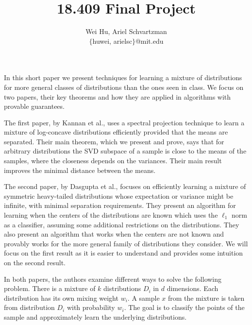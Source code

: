 \documentclass[11pt,letter]{article}
\begin{document}


\title{18.409 Final Project}

\author{Wei Hu, Ariel Schvartzman \\ $\{$huwei, arielsc$\}$@mit.edu} 
 
\maketitle 

In this short paper we present techniques for learning a mixture of distributions for more general classes of distributions than the ones seen in class. We focus on two papers, their key theorems and how they are applied in algorithms with provable guarantees. 

The first paper, by Kannan et al.\cite{doi:10.1137/S0097539704445925}, uses a spectral projection technique to learn a mixture of log-concave distributions efficiently provided that the means are separated. Their main theorem, which we present and prove, says that for arbitrary distributions the SVD subspace of a sample is close to the means of the samples, where the closeness depends on the variances. Their main result improves the minimal distance between the means. 

The second paper, by Dasgupta et al.\cite{1530741}, focuses on efficiently learning a mixture of symmetric heavy-tailed distributions whose expectation or variance might be infinite, with minimal separation requirements. They present an algorithm for learning when the centers of the distributions are known which uses the $\ell_1$ norm as a classifier, assuming some additional restrictions on the distributions. They also present an algorithm that works when the centers are not known and provably works for the more general family of distributions they consider. We will focus on the first result as it is easier to understand and provides some intuition on the second result. 

In both papers, the authors examine different ways to solve the following problem. There is a mixture of $k$ distributions $D_i$ in $d$ dimensions. Each distribution has its own mixing weight $w_i$. A sample $x$ from the mixture is taken from distribution $D_i$ with probability $w_i$. The goal is to classify the points of the sample and approximately learn the underlying distributions. 
\end{document}
